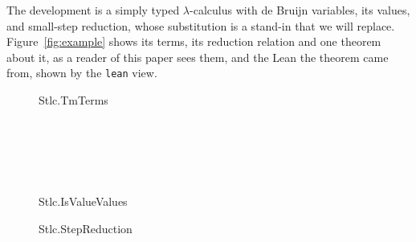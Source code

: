 \documentclass[acmsmall,screen,review,anonymous,nonacm]{acmart}
\begin{document}
The development is a simply typed
$\lambda$-calculus with de Bruijn variables, its values, and small-step
reduction, whose substitution is a stand-in that we will replace. Figure~\ref{fig:example} shows its terms, its reduction relation and one
theorem about it, as a reader of this paper sees them, and the Lean the
theorem came from, shown by the \texttt{lean} view.
\begin{figure}[t]
\begin{leangrammar}[sum=GYQkvbUOd0, dflt=x2x8yBvUWM]{Stlc.Tm}{Terms}
\label{gram:Stlc.Tm}\begin{LeanDisplay}
\\
\\
\\
\\
\end{LeanDisplay}
\end{leangrammar}

\begin{leanrules}[sum=mXx-JpINJ1]{Stlc.IsValue}{Values}
\end{leanrules}

\begin{leanrules}[sum=5cW2xFjnlQ]{Stlc.Step}{Reduction}
\end{leanrules}


\end{figure}
\end{document}
